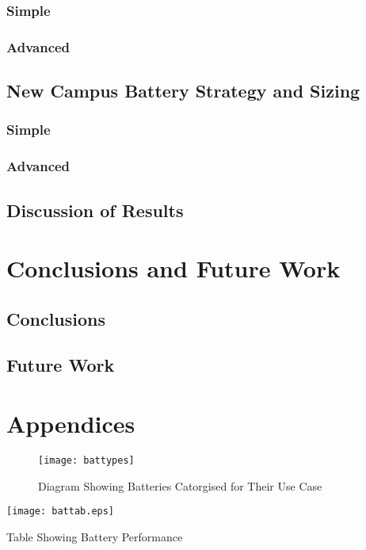 \subsubsection{Simple}\label{simple}

\subsubsection{Advanced}\label{advanced}

\subsection{New Campus Battery Strategy and
Sizing}\label{new-campus-battery-strategy-and-sizing}

\subsubsection{Simple}\label{simple-1}

\subsubsection{Advanced}\label{advanced-1}

\subsection{Discussion of Results}\label{discussion-of-results}

\section{Conclusions and Future Work}\label{conclusions-and-future-work}

\subsection{Conclusions}\label{conclusions}

\subsection{Future Work}\label{future-work}

\newpage

\section{Appendices}

\begin{figure}[H]
\centering
\texttt{[image: battypes]}
\caption{Diagram Showing Batteries Catorgised for Their Use Case \cite{Dunn928}}
\label{battypes}
\end{figure}

\begin{landscape}

\begin{table}[H]
\centering
\texttt{[image: battab.eps]}
\caption{Table Showing Battery Performance}
\label{battabs}
\end{table}

\end{landscape}
